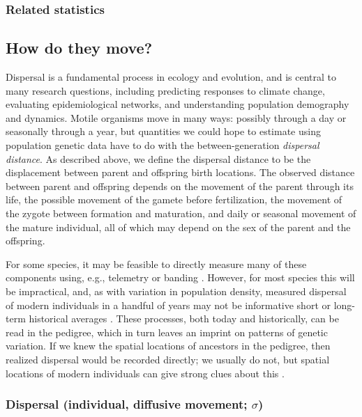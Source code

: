 \documentclass{ar-1col}
\newcommand{\todo}[1]{{\textbf{\color{red}{#1}}}}
\begin{document}
\subsubsection{Related statistics}

\todo{deeper coalescences in denser areas, more diversity and lower p(IBD), theta, heterozygosity, genome-sharing, drift btwn generations, or, e.g., old trees vs. saplings}


\subsection{How do they move?}

Dispersal is a fundamental process in ecology and evolution,
and is central to many research questions,
including predicting responses to climate change,
evaluating epidemiological networks,
and understanding population demography and dynamics.
Motile organisms move in many ways:
possibly through a day or seasonally through a year,
but quantities we could hope to estimate using population genetic data
have to do with the between-generation \textit{dispersal distance}.
As described above,
we define the dispersal distance to be the displacement
between parent and offspring birth locations.
The observed distance between parent and offspring
depends on the movement of the parent through its life,
the possible movement of the gamete before fertilization,
the movement of the zygote between formation and maturation,
and daily or seasonal movement of the mature individual,
all of which may depend on the sex of the parent and the offspring.

For some species,
it may be feasible to directly measure many of these components
using, e.g., telemetry or banding \cite{dispersal_estimation}.
However, for most species this will be impractical,
and, as with variation in population density,
measured dispersal of modern individuals in a handful of years
may not be informative short or long-term historical averages
\cite{WhitlockMcCauley1999}.
These processes,
both today and historically,
can be read in the pedigree,
which in turn leaves an imprint on patterns of genetic variation.
If we knew the spatial locations of ancestors in the pedigree,
then realized dispersal would be recorded directly;
we usually do not, but spatial locations of modern individuals
can give strong clues about this \cite{Cayuela2018}.

\subsubsection{Dispersal (individual, diffusive movement; $\sigma$)}
\end{document}
